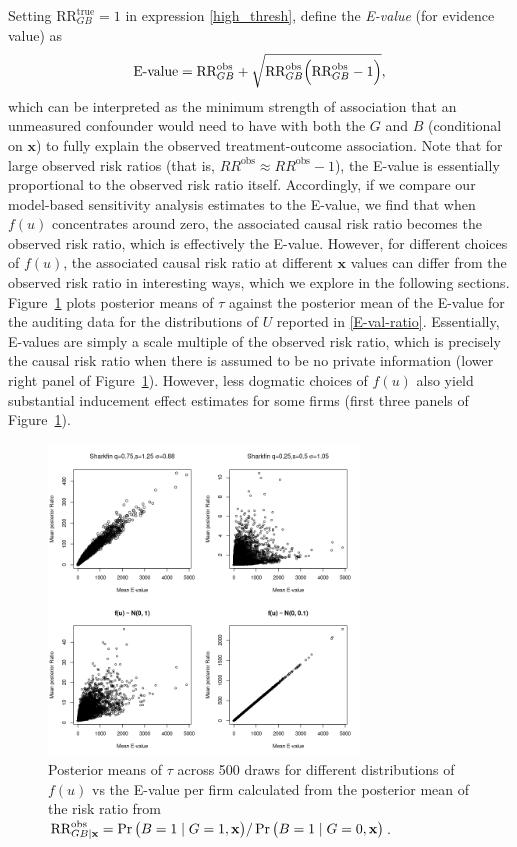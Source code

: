 \documentclass[aoas,preprint, 11pt, dvipsnames, table, x11name]{imsart}
\renewcommand{\bm}[1]{\mathbf{#1}}
\theoremstyle{remark}
\begin{document}
	
	Setting $\text{RR}_{GB}^{\text{true}}=1$ in expression \ref{high_thresh}, \cite{Peng-2016} define the {\em E-value} (for evidence value) as
	\begin{equation}
		\text{E-value} = \text{RR}^{\text{obs}}_{GB}+\sqrt{\text{RR}^{\text{obs}}_{GB}\qty(\text{RR}^{\text{obs}}_{GB}-1)},
		\label{eval_full}
	\end{equation} 
	which can be interpreted as the minimum strength of association that an unmeasured confounder would need to have with both the $G$ and $B$ (conditional on $\bm{x}$) to fully explain the observed treatment-outcome association. Note that for large observed risk ratios (that is, $RR^{\text{obs}} \approx RR^{\text{obs}} - 1$), the E-value is essentially proportional to the observed risk ratio itself. Accordingly, if we compare our model-based sensitivity analysis estimates to the E-value, we find that when $f(u)$ concentrates around zero, the associated causal risk ratio becomes the observed risk ratio, which is effectively the E-value. However, for different choices of $f(u)$, the associated causal risk ratio at different $\bm{x}$ values can differ from the observed risk ratio in interesting ways, which we explore in the following sections. Figure~\ref{E-val-ratio_audit} plots posterior means of $\tau$ against the posterior mean of the E-value for the auditing data for the distributions of $U$ reported in \ref{E-val-ratio}. Essentially, E-values are simply a scale multiple of the observed risk ratio, which is precisely the causal risk ratio when there is assumed to be no private information (lower right panel of Figure~\ref{E-val-ratio_audit}). However, less dogmatic choices of $f(u)$ also yield substantial inducement effect estimates for some firms (first three panels of Figure~\ref{E-val-ratio_audit}).
	\begin{figure}[h]
		\centering
		
		\includegraphics[height=8.25cm]{Eval_vs_U_ratio_constrained_png}
		
		\caption[E-value vs ratio]{  Posterior means of $\tau$ across 500 draws for different distributions of $f(u)$ vs the E-value per firm calculated from the posterior mean of the risk ratio from $\text{RR}^{\text{obs}}_{GB\mid \bm{x}}=\Pr\qty(B=1\mid G=1, \bm{x})/\Pr\qty(B=1\mid G=0, \bm{x})$. }
		\label{E-val-ratio_audit}
		
	\end{figure}
	
\end{document}
